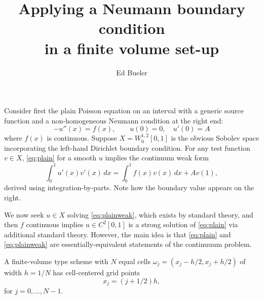 \documentclass[12pt]{amsart}
\begin{document}
\title{Applying a Neumann boundary condition \\ in a finite volume set-up}

\author{Ed Bueler}

\maketitle

Consider first the plain Poisson equation on an interval with a generic source function and a non-homogeneous Neumann condition at the right end:
\begin{equation}
-u''(x) = f(x), \qquad u(0)=0, \quad u'(0)=A \label{eq:plain}
\end{equation}
where $f(x)$ is continuous.  Suppose $X = W_0^{1,2}[0,1]$ is the obvious Sobolev space incorporating the left-hand Dirichlet boundary condition.  For any test function $v\in X$, \eqref{eq:plain} for a smooth $u$ implies the continuum weak form
\begin{equation}
\int_0^1 u'(x) v'(x)\,dx = \int_0^1 f(x) v(x)\,dx + A v(1), \label{eq:plainweak}
\end{equation}
derived using integration-by-parts.  Note how the boundary value appears on the right.

We now seek $u\in X$ solving \eqref{eq:plainweak}, which exists by standard theory, and then $f$ continuous implies $u\in C^2[0,1]$ is a strong solution of \eqref{eq:plain} via additional standard theory.  However, the main idea is that \eqref{eq:plain} and \eqref{eq:plainweak} are essentially-equivalent statements of the continuuum problem.

A finite-volume type scheme with $N$ equal cells $\omega_j = (x_j-h/2,x_j+h/2)$ of width $h=1/N$ has cell-centered grid points
\begin{equation}
x_j = (j+1/2) h, \label{eq:fvgridpoints}
\end{equation}
for $j=0,\dots,N-1$.
\end{document}

